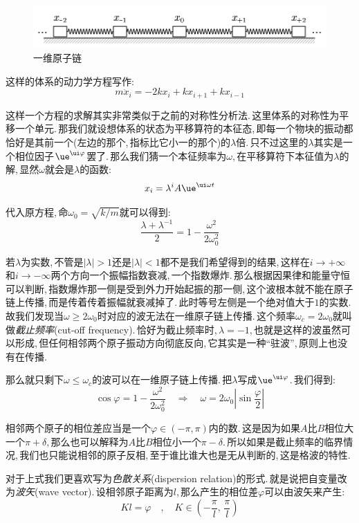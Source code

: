 \begin{figure}[H]
\centering
\includegraphics[width=15cm]{image/6-3-13.png}
\caption{一维原子链}
\end{figure}

这样的体系的动力学方程写作:
\[m\ddot{x}_i=-2kx_i+kx_{i+1}+kx_{i-1}\]

这样一个方程的求解其实非常类似于之前的对称性分析法.\,这里体系的对称性为平移一个单元.\,那我们就设想体系的状态为平移算符的本征态,\,即每一个物块的振动都恰好是其前一个(左边的那个,\,指标比它小一的那个)的$\lambda$倍.\,只不过这里的$\lambda$其实是一个相位因子$\ue^{\ui \varphi}$罢了.\,那么我们猜一个本征频率为$\omega$,\,在平移算符下本征值为$\lambda$的解,\,显然$\omega$就会是$\lambda$的函数:
\[x_i=\lambda^i A\ue^{\ui\omega t}\]

代入原方程,\,命$\omega_0=\sqrt{k/m}$就可以得到:
\[\frac{\lambda+\lambda^{-1}}{2}=1-\frac{\omega^2}{2\omega_0^2}\]

若$\lambda$为实数,\,不管是$|\lambda|>1$还是$|\lambda|<1$都不是我们希望得到的结果,\,这样在$i\to+\infty$和$i\to-\infty$两个方向一个振幅指数衰减,\,一个指数爆炸.\,那么根据因果律和能量守恒可以判断,\,指数爆炸那一侧是受到外力开始起振的那一侧,\,这个波根本就不能在原子链上传播,\,而是传着传着振幅就衰减掉了.\,此时等号左侧是一个绝对值大于$1$的实数.\,故我们发现当$\omega\geq 2\omega_0$时对应的波无法在一维原子链上传播.\,这个频率$\omega_c=2\omega_0$就叫做\emph{截止频率}(cut-off frequency).\,恰好为截止频率时,\,$\lambda=-1$,\,也就是这样的波虽然可以形成,\,但任何相邻两个原子振动方向彻底反向,\,它其实是一种``驻波'',\,原则上也没有在传播.

那么就只剩下$\omega\leq \omega_c$的波可以在一维原子链上传播.\,把$\lambda$写成$\ue^{\ui \varphi}$.\,我们得到:
\[\cos\varphi=1-\frac{\omega^2}{2\omega_0^2}\quad \Rightarrow \quad \omega=2\omega_0\left|\sin{\frac{\varphi}{2}}\right|\]

相邻两个原子的相位差应当是一个$\varphi\in (-\pi,\pi)$内的数.\,这是因为如果$A$比$B$相位大一个$\pi+\delta$,\,那么也可以解释为$A$比$B$相位小一个$\pi-\delta$.\,所以如果是截止频率的临界情况,\,我们也只能说相邻的原子反相,\,至于谁比谁大也是无从判断的,\,这是格波的特性.

对于上式我们更喜欢写为\emph{色散关系}(dispersion relation)的形式.\,就是说把自变量改为\emph{波矢}(wave vector).\,设相邻原子距离为$l$,\,那么产生的相位差$\varphi$可以由波矢来产生:
\[Kl=\varphi\quad,\quad K\in\left(-\frac{\pi}{l},\,\frac{\pi}{l}\right)\]

